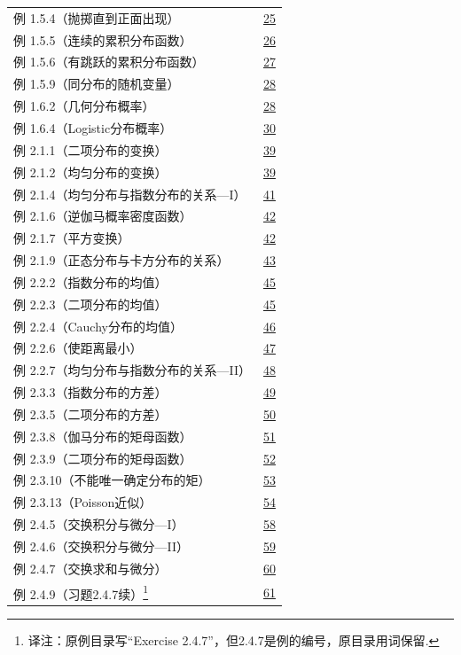 \begin{longtable}{@{}p{}r@{}}
例 1.5.4（抛掷直到正面出现） & \hyperref[ex:1.5.4]{25} \\
例 1.5.5（连续的累积分布函数） & \hyperref[ex:1.5.5]{26} \\
例 1.5.6（有跳跃的累积分布函数） & \hyperref[ex:1.5.6]{27} \\
例 1.5.9（同分布的随机变量） & \hyperref[ex:1.5.9]{28} \\
例 1.6.2（几何分布概率） & \hyperref[ex:1.6.2]{28} \\
例 1.6.4（Logistic分布概率） & \hyperref[ex:1.6.4]{30} \\
\addlinespace[.5em]
例 2.1.1（二项分布的变换） & \hyperref[ex:2.1.1]{39} \\
例 2.1.2（均匀分布的变换） & \hyperref[ex:2.1.2]{39} \\
例 2.1.4（均匀分布与指数分布的关系—I） & \hyperref[ex:2.1.4]{41} \\
例 2.1.6（逆伽马概率密度函数） & \hyperref[ex:2.1.6]{42} \\
例 2.1.7（平方变换） & \hyperref[ex:2.1.7]{42} \\
例 2.1.9（正态分布与卡方分布的关系） & \hyperref[ex:2.1.9]{43} \\
例 2.2.2（指数分布的均值） & \hyperref[ex:2.2.2]{45} \\
例 2.2.3（二项分布的均值） & \hyperref[ex:2.2.3]{45} \\
例 2.2.4（Cauchy分布的均值） & \hyperref[ex:2.2.4]{46} \\
例 2.2.6（使距离最小） & \hyperref[ex:2.2.6]{47} \\
例 2.2.7（均匀分布与指数分布的关系—II） & \hyperref[ex:2.2.7]{48} \\
例 2.3.3（指数分布的方差） & \hyperref[ex:2.3.3]{49} \\
例 2.3.5（二项分布的方差） & \hyperref[ex:2.3.5]{50} \\
例 2.3.8（伽马分布的矩母函数） & \hyperref[ex:2.3.8]{51} \\
例 2.3.9（二项分布的矩母函数） & \hyperref[ex:2.3.9]{52} \\
例 2.3.10（不能唯一确定分布的矩） & \hyperref[ex:2.3.10]{53} \\
例 2.3.13（Poisson近似） & \hyperref[ex:2.3.13]{54} \\
例 2.4.5（交换积分与微分—I） & \hyperref[ex:2.4.5]{58} \\
例 2.4.6（交换积分与微分—II） & \hyperref[ex:2.4.6]{59} \\
例 2.4.7（交换求和与微分） & \hyperref[ex:2.4.7]{60} \\
例 2.4.9（习题2.4.7续）\footnote{译注：原例目录写“Exercise 2.4.7”，但2.4.7是例的编号，原目录用词保留.} & \hyperref[ex:2.4.9]{61} \\

\end{longtable}
